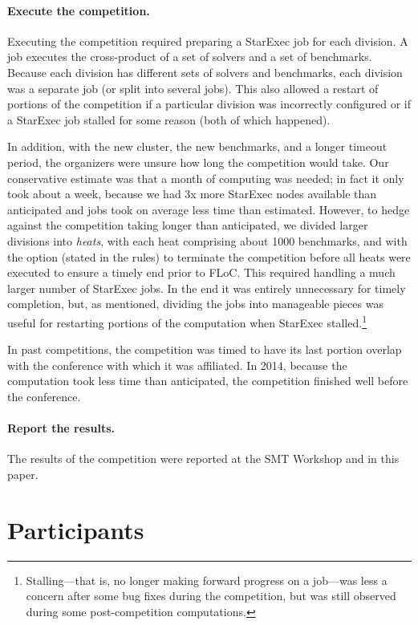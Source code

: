 \documentclass[twoside,11pt]{article}
\begin{document}
\paragraph{Execute the competition.} Executing the competition required preparing a StarExec job for each 
division. A job executes the cross-product of a set of solvers and a set of benchmarks. Because each division has different sets of solvers and benchmarks, each division was a separate job (or split into several jobs). This also allowed a restart of portions of the competition if a particular division was incorrectly configured or if a StarExec job stalled for some reason (both of which happened).

In addition, with the new cluster, the new benchmarks, and a longer timeout period, the organizers were unsure how long the competition would take. Our conservative estimate was that a month of computing was needed; in fact it only took about a week, because we had 3x more StarExec nodes available than anticipated and jobs took on average less time than estimated. However, to hedge against the competition taking longer than anticipated, we divided larger divisions into \emph{heats}, with each heat comprising about 1000 benchmarks, and with the option (stated in the rules) to terminate the competition before all heats were executed to ensure a timely end prior to FLoC. This required handling a much larger number of StarExec jobs. In the end it was entirely unnecessary for timely completion, but, as mentioned, dividing the jobs into manageable pieces was useful for restarting portions of the computation when StarExec stalled.\footnote{Stalling---that is, no longer making forward progress on a job---was less a concern after some bug fixes during the competition, but was still observed during some post-competition computations.}

In past competitions, the competition was timed to have its last portion overlap with the conference with which it was affiliated. In 2014, because the computation took less time than anticipated, the competition finished well before the conference.

\paragraph{Report the results.} The results of the competition were reported at the SMT Workshop and in this paper.

\section{Participants}
\label{sec:participants}
\end{document}

